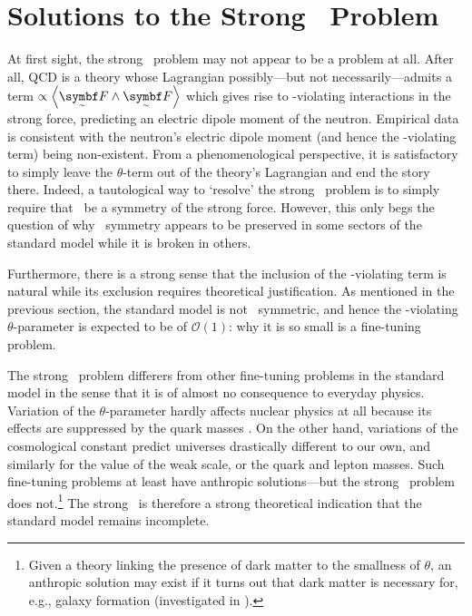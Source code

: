 \chapter{Solutions to the Strong \CP\ Problem}

At first sight, the strong \CP\ problem may not appear to be a problem at all.
After all, QCD is a theory whose Lagrangian possibly---but not necessarily---admits a term $\propto \angbr{\tsbm F \wedge \tsbm F}$ which gives rise to \CP-violating interactions in the strong force, predicting an electric dipole moment of the neutron.
Empirical data is consistent with the neutron's electric dipole moment (and hence the \CP-violating term) being non-existent.
From a phenomenological perspective, it is satisfactory to simply leave the $θ$-term out of the theory's Lagrangian and end the story there.
Indeed, a tautological way to `resolve' the strong \CP\ problem is to simply require that \CP\ be a symmetry of the strong force.
However, this only begs the question of why \CP\ symmetry appears to be preserved in some sectors of the standard model while it is broken in others.

Furthermore, there is a strong sense that the inclusion of the \CP-violating term is natural while its exclusion requires theoretical justification.
As mentioned in the previous section, the standard model is not \CP\ symmetric, and hence the \CP-violating $θ$-parameter is expected to be of $\mathcal{O}(1)$: why it is so small is a fine-tuning problem.

The strong \CP\ problem differers from other fine-tuning problems in the standard model in the sense that it is of almost no consequence to everyday physics.
Variation of the $θ$-parameter hardly affects nuclear physics at all because its effects are suppressed by the quark masses \cite{Dine_2018}.
On the other hand, variations of the cosmological constant predict universes drastically different to our own, and similarly for the value of the weak scale, or the quark and lepton masses.
Such fine-tuning problems at least have anthropic solutions---but the strong \CP\ problem does not.\footnote{
	Given a theory linking the presence of dark matter to the smallness of $θ$, an anthropic solution may exist if it turns out that dark matter is necessary for, e.g., galaxy formation (investigated in \cite{Dine_2018}).
}
The strong \CP\ is therefore a strong theoretical indication that the standard model remains incomplete.


